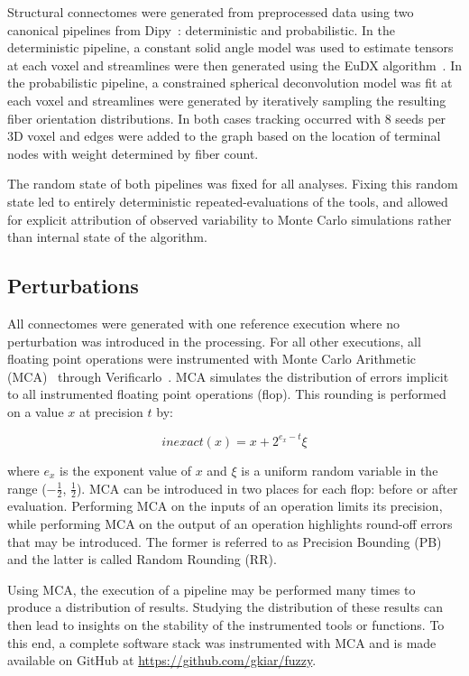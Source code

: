 \documentclass[fleqn,10pt]{SelfArx} %
\newcommand{\new}[1]{{\color{blue} #1}}
\begin{document}
Structural connectomes were generated from preprocessed data using two canonical pipelines from
Dipy~\cite{Garyfallidis2014-ql}: deterministic and probabilistic. In the deterministic pipeline, a constant solid angle
model was used to estimate tensors at each voxel and streamlines were then generated using the EuDX
algorithm~\cite{Garyfallidis2012-gg}. In the probabilistic pipeline, a constrained spherical deconvolution model was
fit at each voxel and streamlines were generated by iteratively sampling the resulting fiber orientation distributions.
In both cases tracking occurred with $8$ seeds per 3D voxel and edges were added to the graph based on the location of
terminal nodes with weight determined by fiber count.

The random state of \new{both} pipelines was fixed for all analyses. Fixing this random \new{state led to entirely
deterministic repeated-evaluations of the tools}, and allowed for explicit
attribution of observed variability to Monte Carlo simulations rather than internal state of the algorithm.

\subsection*{Perturbations}
All connectomes were generated with one reference execution where no perturbation was introduced in the processing. For
all other executions, all floating point operations were instrumented with Monte Carlo Arithmetic
(MCA)~\cite{Parker1997-qq} through Verificarlo~\cite{Denis2016-wo}. MCA simulates the distribution of errors implicit
to all instrumented floating point operations (flop). This rounding is performed on a value $x$ at precision $t$ by:

\begin{equation}
inexact(x) = x + 2^{e_x - t}\xi 
\label{eq:inexact}
\end{equation}

where $e_x$ is the exponent value of $x$ and $\xi$ is a uniform random variable in the range ($-\frac{1}{2}$,
$\frac{1}{2}$). MCA can be introduced in two places for each flop: before or after evaluation. Performing MCA on the
inputs of an operation limits its precision, while performing MCA on the output of an operation highlights round-off
errors that may be introduced. The former is referred to as Precision Bounding (PB) and the latter is called Random
Rounding (RR).

Using MCA, the execution of a pipeline may be performed many times to produce a distribution of results. Studying the
distribution of these results can then lead to insights on the stability of the instrumented tools or functions. To
this end, a complete software stack was instrumented with MCA and is made available on GitHub at
\url{https://github.com/gkiar/fuzzy}.
\end{document}
